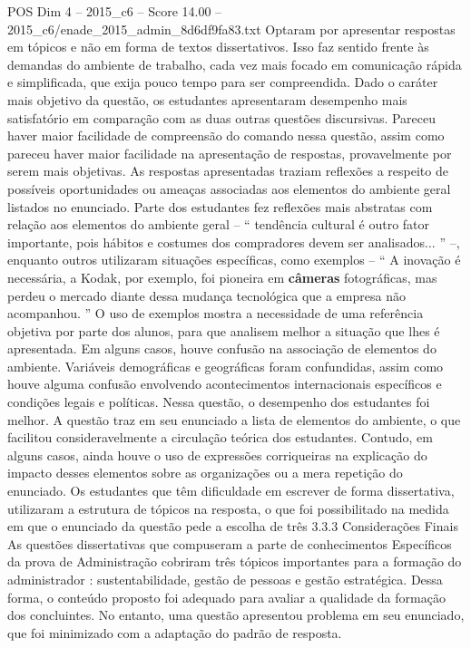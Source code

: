 \begin{textsample}{POS Dim 4 – 2015\_c6 – Score 14.00 – 2015\_c6/enade\_2015\_admin\_8d6df9fa83.txt}
Optaram por apresentar respostas em tópicos e não em forma de textos dissertativos.
Isso faz sentido frente às demandas do ambiente de trabalho, cada vez mais focado em comunicação rápida e simplificada, que exija pouco tempo para ser compreendida.
Dado o caráter mais objetivo da questão, os estudantes apresentaram desempenho mais satisfatório em comparação com as duas outras questões discursivas.
Pareceu haver maior facilidade de compreensão do comando nessa questão, assim como pareceu haver maior facilidade na apresentação de respostas, provavelmente por serem mais objetivas.
As respostas apresentadas traziam reflexões a respeito de possíveis oportunidades ou ameaças associadas aos elementos do ambiente geral listados no enunciado.
Parte dos estudantes fez reflexões mais abstratas com relação aos elementos do ambiente geral – “ tendência cultural é outro fator importante, pois hábitos e costumes dos compradores devem ser analisados... ” –, enquanto outros utilizaram situações específicas, como exemplos – “ A inovação é necessária, a Kodak, por exemplo, foi pioneira em \textbf{câmeras} fotográficas, mas perdeu o mercado diante dessa mudança tecnológica que a empresa não acompanhou. ” O uso de exemplos mostra a necessidade de uma referência objetiva por parte dos alunos, para que analisem melhor a situação que lhes é apresentada.
Em alguns casos, houve confusão na associação de elementos do ambiente.
Variáveis demográficas e geográficas foram confundidas, assim como houve alguma confusão envolvendo acontecimentos internacionais específicos e condições legais e políticas.
Nessa questão, o desempenho dos estudantes foi melhor.
A questão traz em seu enunciado a lista de elementos do ambiente, o que facilitou consideravelmente a circulação teórica dos estudantes.
Contudo, em alguns casos, ainda houve o uso de expressões corriqueiras na explicação do impacto desses elementos sobre as organizações ou a mera repetição do enunciado.
Os estudantes que têm dificuldade em escrever de forma dissertativa, utilizaram a estrutura de tópicos na resposta, o que foi possibilitado na medida em que o enunciado da questão pede a escolha de três 3.3.3 Considerações Finais As questões dissertativas que compuseram a parte de conhecimentos Específicos da prova de Administração cobriram três tópicos importantes para a formação do administrador : sustentabilidade, gestão de pessoas e gestão estratégica.
Dessa forma, o conteúdo proposto foi adequado para avaliar a qualidade da formação dos concluintes.
No entanto, uma questão apresentou problema em seu enunciado, que foi minimizado com a adaptação do padrão de resposta.

\end{textsample}
